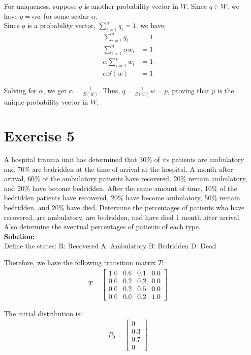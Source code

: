 \documentclass{article}
\begin{document}
For uniqueness, suppose $q$ is another probability vector in $W$. Since $q \in W$, we have $q = \alpha w$ for some scalar $\alpha$. \\

Since $q$ is a probability vector, $\sum_{i=1}^n q_i = 1$, we have:
\begin{align*}
\sum_{i=1}^n q_i &= 1 \\
\sum_{i=1}^n \alpha w_i &= 1 \\
\alpha \sum_{i=1}^n w_i &= 1 \\
\alpha S(w) &= 1
\end{align*}

Solving for $\alpha$, we get $\alpha = \frac{1}{S(w)}$. Thus, $q = \frac{1}{S(w)} w = p$, proving that $p$ is the unique probability vector in $W$.

\newpage

\section*{Exercise 5}
A hospital trauma unit has determined that 30\% of its patients are ambulatory and 70\% are bedridden at the time of arrival at the hospital. A month after arrival, 60\% of the ambulatory patients have recovered, 20\% remain ambulatory, and 20\% have become bedridden. After the same amount of time, 10\% of the bedridden patients have recovered, 20\% have become ambulatory, 50\% remain bedridden, and 20\% have died. Determine the percentages of patients who have recovered, are ambulatory, are bedridden, and have died 1 month after arrival. Also determine the eventual percentages of patients of each type. \\

\textbf{Solution:} \\

Define the states:
R: Recovered
A: Ambulatory
B: Bedridden
D: Dead

Therefore, we have the following transition matrix $T$:
\begin{align*}
T = 
\begin{bmatrix}
1.0 & 0.6 & 0.1 & 0.0 \\
0.0 & 0.2 & 0.2 & 0.0 \\
0.0 & 0.2 & 0.5 & 0.0 \\
0.0 & 0.0 & 0.2 & 1.0
\end{bmatrix}
\end{align*}

The initial distribution is:
\begin{align*}
P_0 = 
\begin{bmatrix}
0 \\
0.3 \\
0.7 \\
0
\end{bmatrix}
\end{align*}
\end{document}
